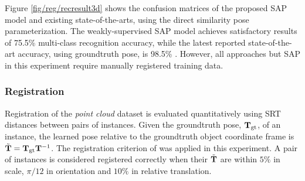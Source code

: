 Figure \ref{fig/reg/recresult3d} shows the confusion matrices of the proposed SAP model and existing state-of-the-arts, using the direct similarity pose parameterization.  
The weakly-supervised SAP model achieves satisfactory results of 75.5\% multi-class recognition accuracy, while the latest reported state-of-the-art accuracy, using groundtruth pose, is 98.5\% \cite{Woodford2013}. However, all approaches but SAP in this experiment require manually registered training data.    

\subsubsection{Registration} 
\label{sec/reg/reg}
Registration of the \emph{point cloud} dataset is evaluated quantitatively using SRT distances \cite{Pham2011} between pairs of instances. Given the groundtruth pose, $\mathbf{T}_\mathrm{gt}$, of an instance, the learned pose relative to the groundtruth object coordinate frame is $\tilde{\mathbf{T}} = \mathbf{T}_\mathrm{gt}\mathbf{T}^{-1}$.  
The registration criterion of \cite{Pham2011} was applied in this experiment. A pair of instances is considered registered correctly when their $\tilde{\mathbf{T}}$ are within $5\%$ in scale, $\pi/12$ in orientation and $10\%$ in relative translation.

